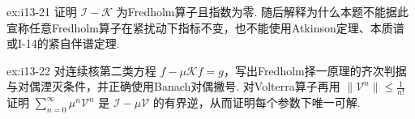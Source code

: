 \begin{FAExercise}[指数零与理论边界]{ex:i13-21}
证明 \(\displaystyle \mathcal I-\mathcal K\) 为Fredholm算子且指数为零. 随后解释为什么本题不能据此宣称任意Fredholm算子在紧扰动下指标不变，也不能使用Atkinson定理、本质谱或I-14的紧自伴谱定理.
\end{FAExercise}

\begin{FAExercise}[积分方程与Volterra唯一可解]{ex:i13-22}
对连续核第二类方程 \(\displaystyle f-\mu\mathcal Kf=g\)，写出Fredholm择一原理的齐次判据与对偶湮灭条件，并正确使用Banach对偶撇号. 对Volterra算子再用 \(\displaystyle \|\mathcal V^n\|\leqslant\frac{1}{n!}\) 证明 \(\displaystyle \sum_{n=0}^{\infty}\mu^n\mathcal V^n\) 是 \(\displaystyle \mathcal I-\mu\mathcal V\) 的有界逆，从而证明每个参数下唯一可解.
\end{FAExercise}
